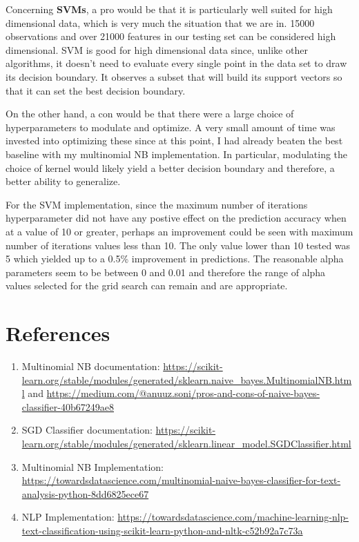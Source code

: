 \documentclass[a4paper,12pt]{article}
\begin{document}
\medskip

Concerning \textbf{SVMs}, a pro would be that it is particularly well suited for high dimensional data, which is very much the situation that we are in. 15000 observations and over 21000 features in our testing set can be considered high dimensional. SVM is good for high dimensional data since, unlike other algorithms, it doesn't need to evaluate every single point in the data set to draw its decision boundary. It observes a subset that will build its support vectors so that it can set the best decision boundary.

\medskip

On the other hand, a con would be that there were a large choice of hyperparameters to modulate and optimize. A very small amount of time was invested into optimizing these since at this point, I had already beaten the best baseline with my multinomial NB implementation. In particular, modulating the choice of kernel would likely yield a better decision boundary and therefore, a better ability to generalize.

\medskip

For the SVM implementation, since the maximum number of iterations hyperparameter did not have any postive effect on the prediction accuracy when at a value of 10 or greater, perhaps an improvement could be seen with maximum number of iterations values less than 10. The only value lower than 10 tested was 5 which yielded up to a 0.5\% improvement in predictions. The reasonable alpha parameters seem to be between 0 and 0.01 and therefore the range of alpha values selected for the grid search can remain and are appropriate.

\section{References}

\begin{enumerate}
    \item Multinomial NB documentation: \url{https://scikit-learn.org/stable/modules/generated/sklearn.naive_bayes.MultinomialNB.html} and \url{https://medium.com/@anuuz.soni/pros-and-cons-of-naive-bayes-classifier-40b67249ae8}
    \item SGD Classifier documentation: \url{https://scikit-learn.org/stable/modules/generated/sklearn.linear_model.SGDClassifier.html}
    \item Multinomial NB Implementation: \url{https://towardsdatascience.com/multinomial-naive-bayes-classifier-for-text-analysis-python-8dd6825ece67}
    \item NLP Implementation: \url{https://towardsdatascience.com/machine-learning-nlp-text-classification-using-scikit-learn-python-and-nltk-c52b92a7c73a}
\end{enumerate}
\end{document}
